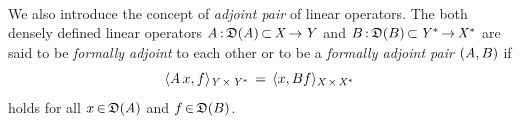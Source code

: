\documentclass[11pt,twoside]{article}
\begin{document}

\paragraph{} %
We also introduce the concept of \textit{adjoint pair} of linear operators.
The both densely defined linear operators
$\mathit{A} {\,:\,} \mathfrak{D}(\mathit{A}) {\,\subset\,} \mathit{X}   {\,\to\,} \mathit{Y}$ and
${B} {\,:\,} \mathfrak{D}({B}) {\,\subset\,} \mathit{Y}^* {\,\to\,} \mathit{X}^*$
are said to be \textit{formally adjoint} to each other
or to be a \textit{formally adjoint pair} $(\mathit{A},{B})$ if
\[
\langle \mathit{A} \,x,f \rangle_{\mathit{Y} {\,\times\,} \mathit{Y}^*} \,=\,
\langle x,{B} f \rangle_{\mathit{X} {\,\times\,} \mathit{X}^*}
\]
holds for all $x {\,\in\,} \mathfrak{D}(\mathit{A})$ and $f {\,\in\,} \mathfrak{D}({B})$.
\end{document}
